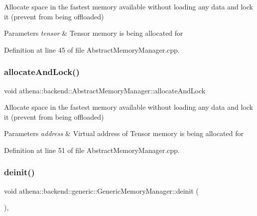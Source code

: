 Allocate space in the fastest memory available without loading any data and lock it (prevent from being offloaded) 
\begin{DoxyParams}{Parameters}
{\em tensor} & Tensor memory is being allocated for \\
\hline
\end{DoxyParams}


Definition at line 45 of file Abstract\+Memory\+Manager.\+cpp.

\mbox{\label{classathena_1_1backend_1_1generic_1_1_generic_memory_manager_ab5305b3d1ab91960bf179ce0be166120}} 
\subsubsection{\texorpdfstring{allocate\+And\+Lock()}{allocateAndLock()}\hspace{0.1cm}{\footnotesize\ttfamily [4/4]}}
{\footnotesize\ttfamily void athena\+::backend\+::\+Abstract\+Memory\+Manager\+::allocate\+And\+Lock}

Allocate space in the fastest memory available without loading any data and lock it (prevent from being offloaded) 
\begin{DoxyParams}{Parameters}
{\em address} & Virtual address of Tensor memory is being allocated for \\
\hline
\end{DoxyParams}


Definition at line 51 of file Abstract\+Memory\+Manager.\+cpp.

\mbox{\label{classathena_1_1backend_1_1generic_1_1_generic_memory_manager_ab90a8874618b851d5309cef66e79d08a}} 
\subsubsection{\texorpdfstring{deinit()}{deinit()}}
{\footnotesize\ttfamily void athena\+::backend\+::generic\+::\+Generic\+Memory\+Manager\+::deinit (\begin{DoxyParamCaption}{ }\end{DoxyParamCaption})\hspace{0.3cm}{\ttfamily [override]}, {\ttfamily [virtual]}}

